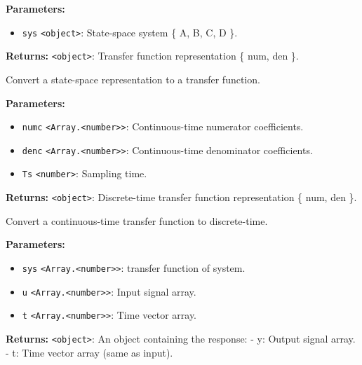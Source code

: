 \documentclass[12pt,a4paper]{article}
\begin{document}
\noindent \textbf{Parameters:}
\begin{itemize}
  \item \texttt{sys} \texttt{<object>}: State-space system \{ A, B, C, D \}.
\end{itemize}

\noindent \textbf{Returns:} \texttt{<object>}: Transfer function representation \{ num, den \}.

\noindent Convert a state-space representation to a transfer function.

\vspace{5mm}
\noindent {}


\noindent \textbf{Parameters:}
\begin{itemize}
  \item \texttt{numc} \texttt{<Array.<number>>}: Continuous-time numerator coefficients.
  \item \texttt{denc} \texttt{<Array.<number>>}: Continuous-time denominator coefficients.
  \item \texttt{Ts} \texttt{<number>}: Sampling time.
\end{itemize}

\noindent \textbf{Returns:} \texttt{<object>}: Discrete-time transfer function representation \{ num, den \}.

\noindent Convert a continuous-time transfer function to discrete-time.

\vspace{5mm}
\noindent {}


\noindent \textbf{Parameters:}
\begin{itemize}
  \item \texttt{sys} \texttt{<Array.<number>>}: transfer function of system.
  \item \texttt{u} \texttt{<Array.<number>>}: Input signal array.
  \item \texttt{t} \texttt{<Array.<number>>}: Time vector array.
\end{itemize}

\noindent \textbf{Returns:} \texttt{<object>}: An object containing the response:
                  - y: Output signal array.
                  - t: Time vector array (same as input).
\end{document}
